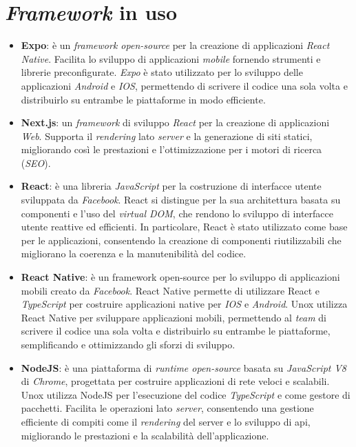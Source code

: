 \section{\textit{Framework} in uso}
\begin{itemize}
    \item \textbf{Expo}: è un \textit{framework open-source} per la creazione di applicazioni \textit{React Native}.
    Facilita lo sviluppo di applicazioni \textit{mobile} fornendo strumenti e librerie preconfigurate.
    \textit{Expo} è stato utilizzato per lo sviluppo delle applicazioni \textit{Android} e \textit{IOS}, permettendo di scrivere il codice una sola volta e distribuirlo su entrambe le piattaforme in modo efficiente.
    \item \textbf{Next.js}: un \textit{framework} di sviluppo \textit{React} per la creazione di applicazioni \textit{Web}.
    Supporta il \textit{rendering} lato \textit{server} e la generazione di siti statici, migliorando così le prestazioni e l'ottimizzazione per i motori di ricerca (\textit{SEO}).
    \item \textbf{React}: è una libreria \textit{JavaScript} per la costruzione di interfacce utente sviluppata da \textit{Facebook}. React si distingue per la sua architettura basata su componenti e l'uso del \textit{virtual DOM}, che rendono lo sviluppo di interfacce utente reattive ed efficienti. In particolare, React è stato utilizzato come base per le applicazioni, consentendo la creazione di componenti riutilizzabili che migliorano la coerenza e la manutenibilità del codice.
    \item \textbf{React Native}: è un framework open-source per lo sviluppo di applicazioni mobili creato da \textit{Facebook}. React Native permette di utilizzare React e \textit{TypeScript} per costruire applicazioni native per \textit{IOS} e \textit{Android}. Unox utilizza React Native per sviluppare applicazioni mobili, permettendo al \textit{team} di scrivere il codice una sola volta e distribuirlo su entrambe le piattaforme, semplificando e ottimizzando gli sforzi di sviluppo.
    \item \textbf{NodeJS}: è una piattaforma di \textit{runtime open-source} basata su \textit{JavaScript V8} di \textit{Chrome}, progettata per costruire applicazioni di rete veloci e scalabili. Unox utilizza NodeJS per l'esecuzione del codice \textit{TypeScript} e come gestore di pacchetti. Facilita le operazioni lato \textit{server}, consentendo una gestione efficiente di compiti come il \textit{rendering} del server e lo sviluppo di \gls{api}\glox, migliorando le prestazioni e la scalabilità dell'applicazione.
\end{itemize}

